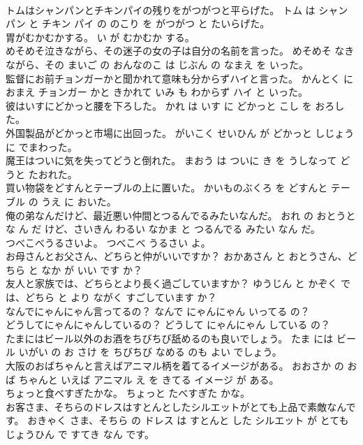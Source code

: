 \documentclass[8pt]{extreport}
\begin{document}
\begin{CJK}{UTF8}{min}
\\	トムはシャンパンとチキンパイの残りをがつがつと平らげた。	トム は シャンパン と チキン パイ の のこり を がつがつ と たいらげた。	
\\	胃がむかむかする。	い が むかむか する。	
\\	めそめそ泣きながら、その迷子の女の子は自分の名前を言った。	めそめそ なきながら、その まいご の おんなのこ は じぶん の なまえ を いった。	
\\	監督にお前チョンガーかと聞かれて意味も分からずハイと言った。	かんとく に おまえ チョンガー かと きかれて いみ も わからず ハイ と いった。	
\\	彼はいすにどかっと腰を下ろした。	かれ は いす に どかっと こし を おろした。	
\\	外国製品がどかっと市場に出回った。	がいこく せいひん が どかっと しじょう に でまわった。	
\\	魔王はついに気を失ってどうと倒れた。	まおう は ついに き を うしなって どうと たおれた。	
\\	買い物袋をどすんとテーブルの上に置いた。	かいものぶくろ を どすんと テーブル の うえ に おいた。	
\\	俺の弟なんだけど、最近悪い仲間とつるんでるみたいなんだ。	おれ の おとうと な ん だ けど、さいきん わるい なかま と つるんでる みたい なん だ。	
\\	つべこべうるさいよ。	つべこべ うるさい よ。	
\\	お母さんとお父さん、どちらと仲がいいですか？	おかあさん と おとうさん、どちら と なか が いい です か？	
\\	友人と家族では、どちらとより長く過ごしていますか？	ゆうじん と かぞく では、どちら と より ながく すごしています か？	
\\	なんでにゃんにゃん言ってるの？	なんで にゃんにゃん いってる の？	
\\	どうしてにゃんにゃんしているの？	どうして にゃんにゃん している の？	
\\	たまにはビール以外のお酒をちびちび舐めるのも良いでしょう。	たま には ビール いがい の お さけ を ちびちび なめる のも よい でしょう。	
\\	大阪のおばちゃんと言えばアニマル柄を着てるイメージがある。	おおさか の おば ちゃんと いえば アニマル え を きてる イメージ が ある。	
\\	ちょっと食べすぎたかな。	ちょっと たべすぎた かな。	
\\	お客さま、そちらのドレスはすとんとしたシルエットがとても上品で素敵なんです。	おきゃく さま、そちら の ドレス は すとんと した シルエット が とても じょうひん で すてき なん です。	

\end{CJK}
\end{document}
